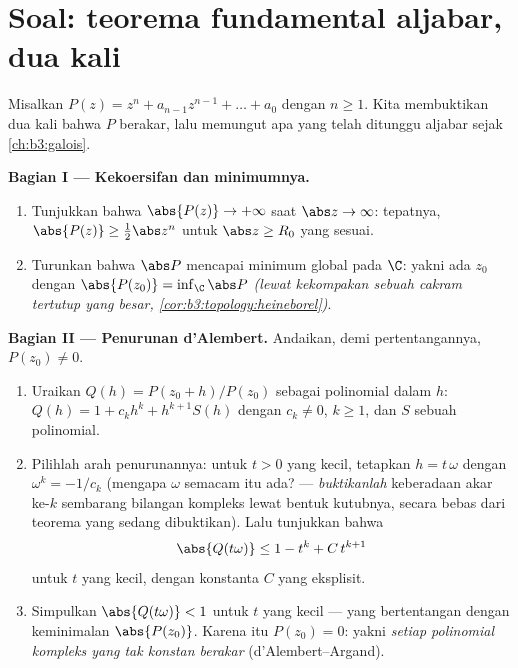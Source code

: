 \section{Soal: teorema fundamental aljabar, dua kali}

\begin{problem}\label{pb:b3:holomorphic:1}
Misalkan $P(z) = z^n + a_{n-1}z^{n-1} + \dots + a_0$ dengan $n \geq 1$.
Kita membuktikan dua kali bahwa $P$ berakar, lalu memungut apa yang telah
ditunggu aljabar sejak \cref{ch:b3:galois}.

\medskip
\noindent\textbf{Bagian I --- Kekoersifan dan minimumnya.}
\begin{enumerate}
  \item Tunjukkan bahwa $\abs{P(z)} \to +\infty$ saat $\abs z \to
        \infty$: tepatnya, $\abs{P(z)} \geq \frac12\abs z^n$
        untuk $\abs z \geq R_0$ yang sesuai.
  \item Turunkan bahwa $\abs P$ mencapai minimum global pada $\C$:
        yakni ada $z_0$ dengan $\abs{P(z_0)} = \inf_\C\abs P$
        \emph{(lewat kekompakan sebuah cakram tertutup yang besar,
        \cref{cor:b3:topology:heineborel})}.
\end{enumerate}

\medskip
\noindent\textbf{Bagian II --- Penurunan d'Alembert.} Andaikan,
demi pertentangannya, $P(z_0) \neq 0$.
\begin{enumerate}[resume]
  \item Uraikan $Q(h) = P(z_0 + h)/P(z_0)$ sebagai polinomial dalam
        $h$: $Q(h) = 1 + c_kh^k + h^{k+1}S(h)$ dengan $c_k \neq
        0$, $k \geq 1$, dan $S$ sebuah polinomial.
  \item Pilihlah arah penurunannya: untuk $t > 0$ yang kecil,
        tetapkan $h = t\,\omega$ dengan $\omega^k = -1/c_k$ (mengapa
        $\omega$ semacam itu ada? --- \emph{buktikanlah}
        keberadaan akar ke-$k$ sembarang bilangan kompleks lewat
        bentuk kutubnya, secara bebas dari teorema yang sedang
        dibuktikan). Lalu tunjukkan bahwa
        \[
        \abs{Q(t\omega)} \leq 1 - t^k + C\,t^{k+1}
        \]
        untuk $t$ yang kecil, dengan konstanta $C$ yang eksplisit.
  \item Simpulkan $\abs{Q(t\omega)} < 1$ untuk $t$ yang kecil ---
        yang bertentangan dengan keminimalan $\abs{P(z_0)}$. Karena itu
        $P(z_0) = 0$: yakni \emph{setiap polinomial kompleks
        yang tak konstan berakar} (d'Alembert--Argand).
\end{enumerate}


\end{problem}
